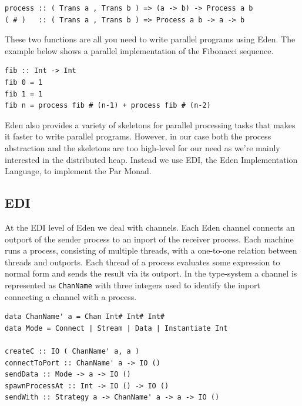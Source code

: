 \documentclass[a4paper, oneside, final]{memoir}
\begin{document}
\begin{lstlisting}
process :: ( Trans a , Trans b ) => (a -> b) -> Process a b
( # )   :: ( Trans a , Trans b ) => Process a b -> a -> b
\end{lstlisting}

These two functions are all you need to write parallel programs using
Eden. The example below shows a parallel implementation of the
Fibonacci sequence. \newline

\begin{lstlisting}
fib :: Int -> Int
fib 0 = 1
fib 1 = 1
fib n = process fib # (n-1) + process fib # (n-2)
\end{lstlisting}

Eden also provides a variety of skeletons for parallel processing
tasks that makes it faster to write parallel programs. However, in
our case both the process abstraction and the skeletons are too 
high-level for our need as we're mainly interested in the distributed
heap. Instead we use EDI, the Eden Implementation Language, to
implement the Par Monad.

\subsection{EDI}
\label{sub:edi}

At the EDI level of Eden we deal with channels. Each Eden channel
connects an outport of the sender process to an inport of the receiver
process. Each machine runs a process, consisting of multiple threads,
with a one-to-one relation between threads and outports. Each thread
of a process evaluates some expression to normal form and sends the
result via its outport. In the type-system a channel is represented as
\texttt{ChanName} with three integers used to identify the inport
connecting a channel with a process. \newline

\begin{lstlisting}
data ChanName' a = Chan Int# Int# Int#
data Mode = Connect | Stream | Data | Instantiate Int

createC :: IO ( ChanName' a, a ) 
connectToPort :: ChanName' a -> IO ()
sendData :: Mode -> a -> IO ()
spawnProcessAt :: Int -> IO () -> IO ()
sendWith :: Strategy a -> ChanName' a -> a -> IO ()
\end{lstlisting}
\end{document}
